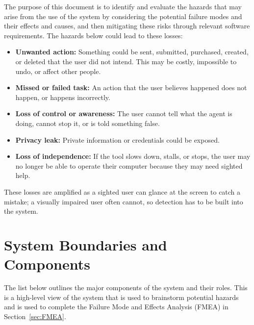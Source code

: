\documentclass{article}
\begin{document}
The purpose of this document is to identify and evaluate the hazards that may arise from the use of the system by considering the potential failure modes and their effects and causes, and then mitigating these risks through relevant software requirements. 
The hazards below could lead to these losses:
\begin{itemize}
  \item \textbf{Unwanted action:} Something could be sent, submitted, purchased, created, or deleted that the user did not intend. This may be costly, impossible to undo, or affect other people.
  \item \textbf{Missed or failed task:} An action that the user believes happened does not happen, or happens incorrectly.
  \item \textbf{Loss of control or awareness:} The user cannot tell what the agent is doing, cannot stop it, or is told something false.
  \item \textbf{Privacy leak:} Private information or credentials could be exposed.
  \item \textbf{Loss of independence:} If the tool slows down, stalls, or stops, the user may no longer be able to operate their computer because they may need sighted help.
\end{itemize}
These losses are amplified as a sighted user can glance at the screen to catch a mistake; a visually impaired user often cannot, so detection has to be built into the system.

\section{System Boundaries and Components}
The list below outlines the major components of the system and their roles. This is a high-level view of the system that is used to brainstorm potential hazards and is used to complete the Failure Mode and Effects Analysis (FMEA) in Section~\ref{sec:FMEA}.
\end{document}
